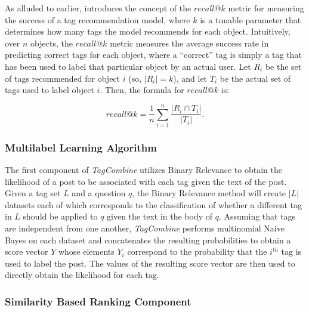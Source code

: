 \documentclass[11pt]{IEEEtran}
\begin{document}
As alluded to earlier, \cite{1} introduces the concept of the $recall@k$ metric for measuring the success of a tag recommendation model, where $k$ is a tunable parameter that determines how many tags the model recommends for each object. Intuitively, over $n$ objects, the $recall@k$ metric measures the average success rate in predicting correct tags for each object, where a ``correct'' tag is simply a tag that has been used to label that particular object by an actual user. Let $R_i$ be the set of tags recommended for object $i$ (so, $|R_i| = k$), and let $T_i$ be the actual set of tags used to label object $i$. Then, the formula for $recall@k$ is:

\[recall@k = \frac{1}{n}\sum\limits_{i=1}^{n}\frac{|R_i \cap T_i|}{|T_i|}.\]

\subsubsection{Multilabel Learning Algorithm}

The first component of \textit{TagCombine} utilizes Binary Relevance to obtain the likelihood of a post to be associated with each tag given the text of the post. Given a tag set $L$ and a question $q$, the Binary Relevance method will create $|L|$ datasets each of which corresponds to the classification of whether a different tag in $L$ should be applied to $q$ given the text in the body of $q$. Assuming that tags are independent from one another, \textit{TagCombine} performs multinomial Naive Bayes on each dataset and concatenates the resulting probabilities to obtain a score vector $Y$ whose elements $Y_i$ correspond to the probability that the $i^{th}$ tag is used to label the post. The values of the resulting score vector are then used to directly obtain the likelihood for each tag.

\subsubsection{Similarity Based Ranking Component}
\end{document}
